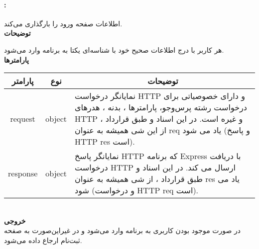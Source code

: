 \paragraph{:}
اطلاعات صفحه ورود را بارگذاری می‌کند.
\\
\textbf{توضیحات}
\hr
\begin{flushleft}
	\framebox[.9\textwidth][l]{
		\lr{
			\textcolor{type}{void}
			\textcolor{func}{getLogIn}
			\textcolor{symb}{(}
			\textcolor{type}{object}
			\textcolor{arg}{request}
			\textcolor{symb}{,}
			\textcolor{type}{object}
			\textcolor{arg}{response}
			\textcolor{symb}{);}
		}
	}
\end{flushleft}
هر کاربر با درج اطلاعات صحیح خود با شناسه‌ای یکتا به برنامه وارد می‌شود.
\\
\textbf{پارامترها}
\hr \\[10pt]
\begin{tabular}{|m{4cm}|m{3cm}|m{10cm}|}
	\hline
	\multicolumn{1}{|c}{پارامتر}
	&
	\multicolumn{1}{|c}{نوع}
	&
	\multicolumn{1}{|c|}{توضیحات}
	\\
	\hline
	\multicolumn{1}{|c}{request}
	&
	\multicolumn{1}{|c|}{object}
	&
	نمایانگر درخواست HTTP و دارای خصوصیاتی برای درخواست رشته پرس‌و‌جو، پارامترها ، بدنه ، هدرهای HTTP و غیره است.
	در این اسناد و طبق قرارداد ، از این شی همیشه به عنوان req یاد می شود (و پاسخ HTTP res است).
	\\
	\hline
	\multicolumn{1}{|c}{response}
	&
	\multicolumn{1}{|c|}{object}
	&
	نمایانگر پاسخ HTTP که برنامه Express با دریافت درخواست HTTP ارسال می کند.
	در این اسناد و طبق قرارداد ، از شی همیشه به عنوان res یاد می شود (و درخواست HTTP req است).
	\\
	\hline
\end{tabular}
\\[10pt]
\textbf{خروجی}
\hr \\
در صورت موجود بودن کاربری به برنامه وارد می‌شود و در غیراین‌صورت به صفحه ثبت‌نام ارجاع داده می‌شود.

